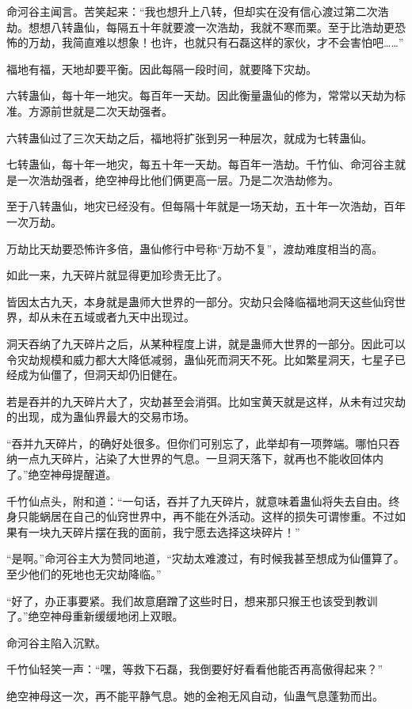 \begin{this_body}
命河谷主闻言。苦笑起来：“我也想升上八转，但却实在没有信心渡过第二次浩劫。想想八转蛊仙，每隔五十年就要渡一次浩劫，我就不寒而栗。至于比浩劫更恐怖的万劫，我简直难以想象！也许，也就只有石磊这样的家伙，才不会害怕吧……”

福地有福，天地却要平衡。因此每隔一段时间，就要降下灾劫。

六转蛊仙，每十年一地灾。每百年一天劫。因此衡量蛊仙的修为，常常以天劫为标准。方源前世就是二次天劫强者。

六转蛊仙过了三次天劫之后，福地将扩张到另一种层次，就成为七转蛊仙。

七转蛊仙，每十年一地灾，每五十年一天劫。每百年一浩劫。千竹仙、命河谷主就是一次浩劫强者，绝空神母比他们俩更高一层。乃是二次浩劫修为。

至于八转蛊仙，地灾已经没有。但每隔十年就是一场天劫，五十年一次浩劫，百年一次万劫。

万劫比天劫要恐怖许多倍，蛊仙修行中号称“万劫不复”，渡劫难度相当的高。

如此一来，九天碎片就显得更加珍贵无比了。

皆因太古九天，本身就是蛊师大世界的一部分。灾劫只会降临福地洞天这些仙窍世界，却从未在五域或者九天中出现过。

洞天吞纳了九天碎片之后，从某种程度上讲，就是蛊师大世界的一部分。因此可以令灾劫规模和威力都大大降低减弱，蛊仙死而洞天不死。比如繁星洞天，七星子已经成为仙僵了，但洞天却仍旧健在。

若是吞并的九天碎片大了，灾劫甚至会消弭。比如宝黄天就是这样，从未有过灾劫的出现，成为蛊仙界最大的交易市场。

“吞并九天碎片，的确好处很多。但你们可别忘了，此举却有一项弊端。哪怕只吞纳一点九天碎片，沾染了大世界的气息。一旦洞天落下，就再也不能收回体内了。”绝空神母提醒道。

千竹仙点头，附和道：“一句话，吞并了九天碎片，就意味着蛊仙将失去自由。终身只能蜗居在自己的仙窍世界中，再不能在外活动。这样的损失可谓惨重。不过如果有一块九天碎片摆在我的面前，我宁愿去选择这块碎片！”

“是啊。”命河谷主大为赞同地道，“灾劫太难渡过，有时候我甚至想成为仙僵算了。至少他们的死地也无灾劫降临。”

“好了，办正事要紧。我们故意磨蹭了这些时日，想来那只猴王也该受到教训了。”绝空神母重新缓缓地闭上双眼。

命河谷主陷入沉默。

千竹仙轻笑一声：“嘿，等救下石磊，我倒要好好看看他能否再高傲得起来？”

绝空神母这一次，再不能平静气息。她的金袍无风自动，仙蛊气息蓬勃而出。


\end{this_body}

